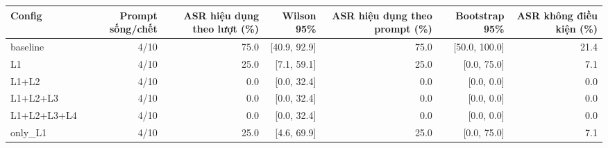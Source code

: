 \begin{tabular}{lrrrrrr}
\toprule
Config & Prompt sống/chết & ASR hiệu dụng theo lượt (\%) & Wilson 95\% & ASR hiệu dụng theo prompt (\%) & Bootstrap 95\% & ASR không điều kiện (\%) \\
\midrule
baseline & 4/10 & 75.0 & [40.9, 92.9] & 75.0 & [50.0, 100.0] & 21.4 \\
L1 & 4/10 & 25.0 & [7.1, 59.1] & 25.0 & [0.0, 75.0] & 7.1 \\
L1+L2 & 4/10 & 0.0 & [0.0, 32.4] & 0.0 & [0.0, 0.0] & 0.0 \\
L1+L2+L3 & 4/10 & 0.0 & [0.0, 32.4] & 0.0 & [0.0, 0.0] & 0.0 \\
L1+L2+L3+L4 & 4/10 & 0.0 & [0.0, 32.4] & 0.0 & [0.0, 0.0] & 0.0 \\
only\_L1 & 4/10 & 25.0 & [4.6, 69.9] & 25.0 & [0.0, 75.0] & 7.1 \\
\bottomrule
\end{tabular}
